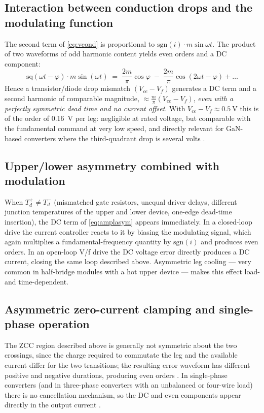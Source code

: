 \documentclass[11pt,a4paper]{article}
\begin{document}
\subsection{Interaction between conduction drops and the modulating function}

The second term of \eqref{eq:vcond} is proportional to
$\mathrm{sgn}(i)\cdot m\sin\omega t$. The product of two waveforms of odd harmonic
content yields even orders and a DC component:
\begin{equation}
\mathrm{sq}(\omega t-\varphi)\cdot m\sin(\omega t)
\;=\; \frac{2m}{\pi}\cos\varphi
\;-\;\frac{2m}{\pi}\cos(2\omega t-\varphi) + \dots
\end{equation}
Hence a transistor/diode drop mismatch $\left(V_{ce}-V_{f}\right)$ generates a DC term and
a second harmonic of comparable magnitude,
$\approx \tfrac{m}{\pi}\left(V_{ce}-V_{f}\right)$, \emph{even with a perfectly symmetric
dead time and no current offset}. With $V_{ce}-V_{f}\approx\SI{0.5}{\volt}$ this is of the
order of \SI{0.16}{\volt} per leg: negligible at rated voltage, but comparable with the
fundamental command at very low speed, and directly relevant for GaN-based converters
where the third-quadrant drop is several volts \cite{munoz1999,bedetti2015,lidow2019}.

\subsection{Upper/lower asymmetry combined with modulation}

When $T_{d}^{+}\neq T_{d}^{-}$ (mismatched gate resistors, unequal driver delays,
different junction temperatures of the upper and lower device, one-edge dead-time
insertion), the DC term of \eqref{eq:amplasym} appears immediately. In a closed-loop
drive the current controller reacts to it by biasing the modulating signal, which again
multiplies a fundamental-frequency quantity by $\mathrm{sgn}(i)$ and produces even orders.
In an open-loop V/f drive the DC voltage error directly produces a DC current, closing the
same loop described above. Asymmetric leg cooling --- very common in half-bridge modules
with a hot upper device --- makes this effect load- and time-dependent.

\subsection{Asymmetric zero-current clamping and single-phase operation}

The ZCC region described above is generally not symmetric about the two crossings, since
the charge required to commutate the leg and the available current differ for the two
transitions; the resulting error waveform has different positive and negative durations,
producing even orders \cite{benbrahim2004,zhang2014}. In single-phase converters (and in
three-phase converters with an unbalanced or four-wire load) there is no cancellation
mechanism, so the DC and even components appear directly in the output current
\cite{buticchi2011,herran2013}.
\end{document}
